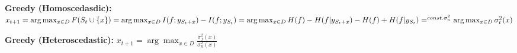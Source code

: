 \textbf{Greedy (Homoscedasdic):} $x_{t+1} = \arg \max_{x \in D} F(S_t \cup \{x \}) \\
= \arg \max_{x \in D} I(f; y_{S_t + x}) - I(f; y_{S_t})
= \arg \max_{x \in D} H(f) - H(f|y_{S_t + x}) - H(f) + H(f|y_{S_t})
=^{const. \sigma_n^2} \arg \max_{x \in D} \sigma_t^2(x)$\\
\begin{comment}
		F(S) is NP-Hard to optimize in this discrete case, we often use heuristics to solve this problem.\\
		x could be something continuous or non-deterministic (e.g. throw a sensor somewhere), then this optimization problem changes.\\
		With the greedy approach, and the assumption that we have constant (homoscedastic) noise, we just pick the points where we are the most uncertain. In other words, we can maximise greedily the mutual information.\\
		This way of collecting the set of points is near-optimal.\\
		\textbf{Derivation:} $x_{t+1} = \arg \max_{x \in D} F(S_t \cup \{x \}) \\
= \arg \max_{x \in D} F(S_t \cup \{x \}) - F(S_t)\\
= \arg \max_{x \in D} I(f; y_{S_t + x}) - I(f; y_{S_t})\\
= \arg \max_{x \in D} H(f) - H(f|y_{S_t + x}) - H(f) + H(f|y_{S_t})\\
= \arg \max_{x \in D} H(f|y_{S_t}) - H(f|y_{S_t + x})\\
= \arg \max_{x \in D} I(f; y_x|y_{S_t})\\
=^{Gauss} \arg \max_{x \in D} \frac{1}{2} \log (1+ \frac{\sigma_t^2(x)}{\sigma_n^2})\\
=^{const. \sigma_n^2} \arg \max_{x \in D} \sigma_t^2(x)$\\
\end{comment}

\textbf{Greedy (Heteroscedastic):} $x_{t+1} = \arg \max_{x \in D} \frac{\sigma_f^2(x)}{\sigma_n^2(x)}$\\
\begin{comment}
	\textbf{Interpretation:} Epistemic uncertainty divided by the Aleatoric uncertainty. \\
	Just because we are very uncertain at a point, does not mean that we decrease the uncertainty by sampling at that point. It could be that the uncertainty comes from irreducible noise anyways.\\
\end{comment}

